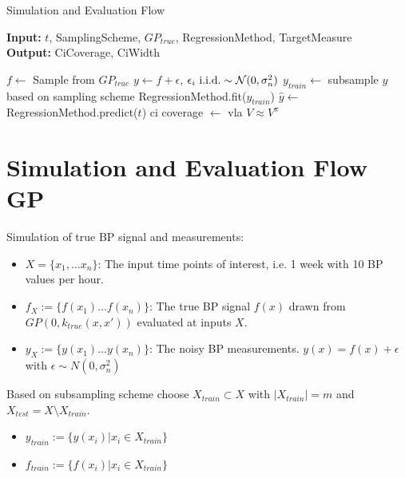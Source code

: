 \begin{algorithm} \caption{Simulation and Evaluation Flow}
 \hspace*{\algorithmicindent} \textbf{Input:} $t$, SamplingScheme, $GP_{true}$,
RegressionMethod, TargetMeasure\\
 \hspace*{\algorithmicindent} \textbf{Output:} CiCoverage, CiWidth
\begin{algorithmic}[1]

        \State $f \gets$ Sample from $GP_{true}$
        \State $y \gets f + \epsilon$, $\epsilon_i \text{ i.i.d.} \sim \operatorname{\mathcal{N}}(0, \sigma_n^2)$
        \State $y_{train} \gets$ subsample $y$ based on sampling scheme
        \State RegressionMethod.fit($y_{train} $)
        \State $\hat{y} \gets$ RegressionMethod.predict($t$)
        \State ci coverage $\gets$ vla
        \EndFor
    \Ensure $V \approx V^\pi$
\end{algorithmic}
\end{algorithm}


\section{Simulation and Evaluation Flow GP}

Simulation of true BP signal and measurements:
    \begin{itemize}
        \item $X=\{x_1, \dots x_n\}$: The input time points of interest, i.e. 1 week with 10 BP values per hour.
        \item $f_X := \{f(x_1) \dots f(x_n)\}$: The true BP signal $f(x)$ drawn from $GP(0, k_{true}(x,x'))$ evaluated at inputs $X$.
        \item $y_X := \{y(x_1) \dots y(x_n)\}$: The noisy BP measurements. $y(x)= f(x) + \epsilon$ with $\epsilon \sim N(0, \sigma_n^2)$
    \end{itemize}

Based on subsampling scheme choose $X_{train} \subset X$ with $|X_{train}| = m$ and $X_{test} = X \setminus X_{train}$.
\begin{itemize}
    \item $y_{train} := \{y(x_i) | x_i \in X_{train}\}$
    \item  $f_{train} := \{f(x_i) | x_i \in X_{train}\}$
\end{itemize}


